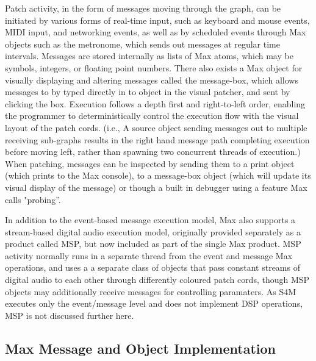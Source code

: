 \documentclass[acmsmall]{acmart}
\begin{document}
Patch activity, in the form of messages moving through the graph, can be initiated by 
various forms of real-time input, such as keyboard and mouse events, MIDI input, and networking 
events, as well as by scheduled events through Max objects such as the metronome, which sends
out messages at regular time intervals. Messages are 
stored internally as lists of Max atoms, which may be symbols, integers, or floating point numbers. 
There also exists a Max object for visually displaying and altering messages called the message-box,
which allows messages to by typed directly in to object in the visual patcher, and sent by clicking the box.  
Execution follows a depth first and right-to-left order, enabling the programmer to deterministically 
control the execution flow with the visual layout of the patch cords. (i.e., A source object sending 
messages out to multiple receiving sub-graphs results in the right hand message path completing 
execution before moving left, rather than spawning two concurrent threads of execution.) When 
patching, messages can be inspected by sending them to a print object (which prints to the Max console),
to a message-box object (which will update its visual display of the message) 
or though a built in debugger using a feature Max calls "probing”.

In addition to the event-based message execution model, Max also supports a stream-based digital 
audio execution model, originally provided separately as a product called MSP, but now included 
as part of the single Max product.
MSP activity normally runs in a separate thread from the event and message Max operations, and uses a  
a separate class of objects that pass constant streams of digital audio to each other through differently 
coloured patch cords, though MSP objects may additionally receive messages for controlling paramaters. As  
S4M executes only the event/message level and does not implement DSP operations, MSP is not 
discussed further here. 



\subsection{Max Message and Object Implementation} 
\end{document}
